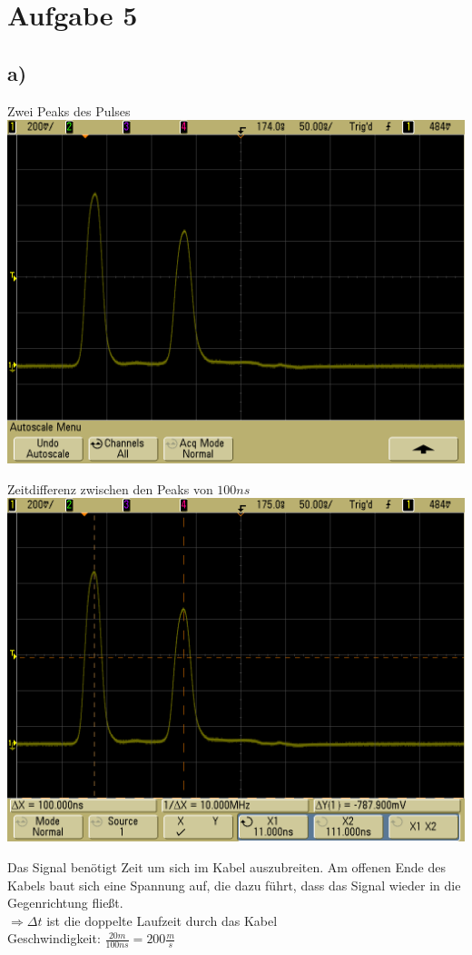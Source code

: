\documentclass[compress,11pt]{beamer}
\begin{document}
\section{Aufgabe 5}
\subsection{a)}
\begin{frame}
\begin{block}{Zwei Peaks des Pulses}
\centering
\includegraphics[width=.85\textwidth]{../daten/scope_28.png}
\end{block}
\end{frame}
\begin{frame}
\begin{block}{Zeitdifferenz zwischen den Peaks von $100 ns$}
\centering
\includegraphics[width=.85\textwidth]{../daten/scope_29.png}
\end{block}
\end{frame}
\begin{frame}
Das Signal benötigt Zeit um sich im Kabel auszubreiten. Am offenen Ende des Kabels baut sich eine Spannung auf, die dazu führt, dass das Signal wieder in die Gegenrichtung fließt. \\
$\Rightarrow \Delta t$ ist die doppelte Laufzeit durch das Kabel\\
Geschwindigkeit: $\frac{20m}{100ns}=200\frac{m}{s}$
\end{frame}
\end{document}
